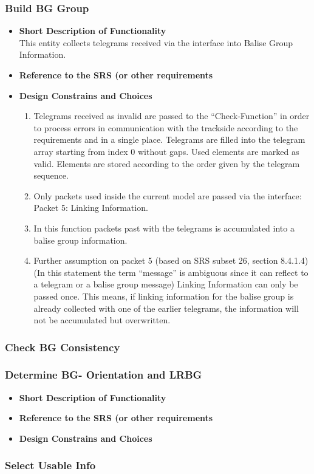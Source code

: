 \subsubsection{Build BG Group}
\begin{itemize}
\item \textbf{Short Description of Functionality}\\
This entity collects telegrams received via the interface into Balise Group Information.
\item \textbf{Reference to the SRS (or other requirements}\\
\item \textbf{Design Constrains and Choices}\\
\begin{enumerate}
\item Telegrams received as invalid are passed to the ``Check-Function'' in order to process errors in communication with the trackside according to the requirements and in a single place.
Telegrams are filled into the telegram array starting from index 0 without gaps. Used elements are marked as valid. Elements are stored according to the order given by the telegram sequence. 
\item Only packets used inside the current model are passed via the interface:\\
	Packet 5: Linking Information.\\
\item In this function packets past with the telegrams is accumulated into a balise group information.\\
\item Further assumption on packet 5 (based on SRS subset 26, section 8.4.1.4)\\
(In this statement the term ``message'' is ambiguous since it can reflect to a telegram or a balise group message)
	Linking Information can only be passed once. This means, if linking information for the balise group is already collected with one of the earlier telegrams, the information will not be accumulated but overwritten.\\
\end{enumerate}
\end{itemize}

\subsubsection{Check BG Consistency}

\subsubsection{Determine BG- Orientation and LRBG}
\begin{itemize}
\item \textbf{Short Description of Functionality}\\
\item \textbf{Reference to the SRS (or other requirements}\\
\item \textbf{Design Constrains and Choices}\\
\end{itemize}
			
\subsubsection{Select Usable Info}
